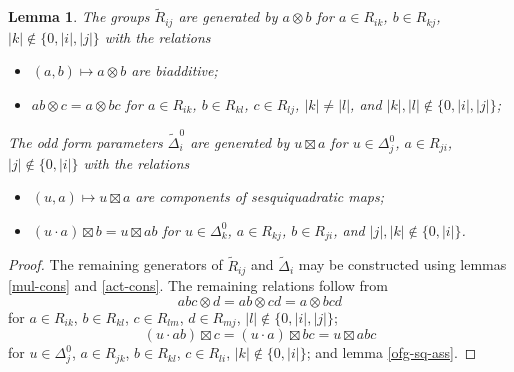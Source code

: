 \documentclass{article}
\newtheorem{lemma}{Lemma}
\theoremstyle{definition}
\begin{document}
\begin{lemma} \label{ucext-pres}
    The groups \(\widetilde R_{ij}\) are generated by \(a \otimes b\) for \(a \in R_{ik}\), \(b \in R_{kj}\), \(
        |k| \notin \{0, |i|, |j|\}
    \) with the relations
    \begin{itemize}

        \item \(
            (a, b) \mapsto a \otimes b
        \) are biadditive;

        \item \(
            ab \otimes c = a \otimes bc
        \) for \(a \in R_{ik}\), \(b \in R_{kl}\), \(c \in R_{lj}\), \(|k| \neq |l|\), and \(|k|, |l| \notin \{0, |i|, |j|\}\);

    \end{itemize}
    The odd form parameters \(\widetilde \Delta^0_i\) are generated by \(u \boxtimes a\) for \(u \in \Delta^0_j\), \(a \in R_{ji}\), \(
        |j| \notin \{0, |i|\}
    \) with the relations
    \begin{itemize}

        \item \(
            (u, a) \mapsto u \boxtimes a
        \) are components of sesquiquadratic maps;

        \item \(
            (u \cdot a) \boxtimes b = u \boxtimes ab
        \) for \(u \in \Delta^0_k\), \(a \in R_{kj}\), \(b \in R_{ji}\), and \(|j|, |k| \notin \{0, |i|\}\).

    \end{itemize}
\end{lemma}
\begin{proof}
    The remaining generators of \(\widetilde R_{ij}\) and \(\widetilde \Delta_i\) may be constructed using lemmas \ref{mul-cons} and \ref{act-cons}. The remaining relations follow from \[
        abc \otimes d = ab \otimes cd = a \otimes bcd
    \]
    for \(a \in R_{ik}\), \(b \in R_{kl}\), \(c \in R_{lm}\), \(d \in R_{mj}\), \(
        |l| \notin \{0, |i|, |j|\}
    \); \[
        (u \cdot ab) \boxtimes c
        =
        (u \cdot a) \boxtimes bc
        =
        u \boxtimes abc
    \] for \(u \in \Delta^0_j\), \(a \in R_{jk}\), \(b \in R_{kl}\), \(c \in R_{li}\), \(|k| \notin \{0, |i|\}\); and lemma \ref{ofg-sq-ass}.
\end{proof}
\end{document}
